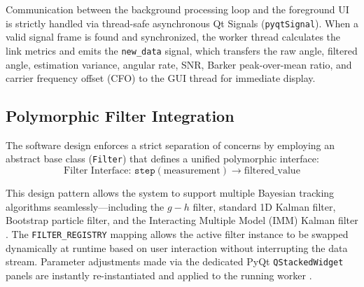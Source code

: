 \documentclass[conference]{IEEEtran}
\begin{document}
Communication between the background processing loop and the foreground UI is strictly handled via thread-safe asynchronous Qt Signals (\texttt{pyqtSignal}). When a valid signal frame is found and synchronized, the worker thread calculates the link metrics and emits the \texttt{new\_data} signal, which transfers the raw angle, filtered angle, estimation variance, angular rate, SNR, Barker peak-over-mean ratio, and carrier frequency offset (CFO) to the GUI thread for immediate display.

\subsection{Polymorphic Filter Integration}
The software design enforces a strict separation of concerns by employing an abstract base class (\texttt{Filter}) that defines a unified polymorphic interface:
\begin{equation}
    \text{Filter Interface: } \texttt{step}(\text{measurement}) \rightarrow \text{filtered\_value}
\end{equation}

This design pattern allows the system to support multiple Bayesian tracking algorithms seamlessly—including the $g-h$ filter, standard 1D Kalman filter, Bootstrap particle filter, and the Interacting Multiple Model (IMM) Kalman filter \cite{Hou2023BayesianDoA}. The \texttt{FILTER\_REGISTRY} mapping allows the active filter instance to be swapped dynamically at runtime based on user interaction without interrupting the data stream. Parameter adjustments made via the dedicated PyQt \texttt{QStackedWidget} panels are instantly re-instantiated and applied to the running worker \cite{Lim2020IMMPF}.
\end{document}
